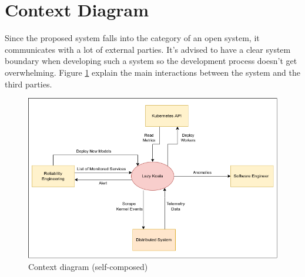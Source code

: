 \section{Context Diagram}

Since the proposed system falls into the category of an open system, it communicates with a lot of external parties. It's advised to have a clear system boundary when developing such a system so the development process doesn't get overwhelming. Figure \ref{fig:context-digram} explain the main interactions between the system and the third parties.

\begin{figure}[H]
   \includegraphics[width=13cm]{assets/requirement-specification/contex-digram.png}
    \caption{Context diagram (self-composed)}
    \label{fig:context-digram}
\end{figure}
